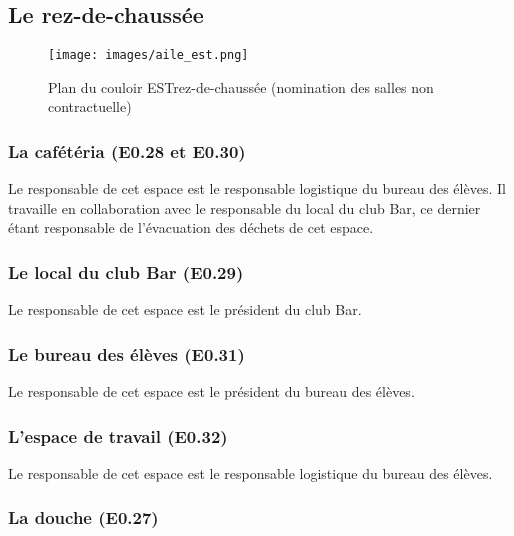 \documentclass{article} %
\begin{document}
		\subsection{Le rez-de-chaussée}
\label{sub:le_rez_de_chaussee}

		\begin{figure}[]
			\centering
			\texttt{[image: images/aile\_est.png]}
			\caption{Plan du couloir EST\@ rez-de-chaussée (nomination des salles
			non contractuelle)}
\label{fig:plan}
		\end{figure}

			\subsubsection{La cafétéria (E0.28 et E0.30)}
\label{ssub:la_cafeteria_e0_28_et_e0_30_}

				Le responsable de cet espace est le responsable logistique du
				bureau des élèves. Il travaille en collaboration avec le
				responsable du local du club Bar, ce dernier étant responsable
				de l’évacuation des déchets de cet espace.

			\subsubsection{Le local du club Bar (E0.29)}
\label{ssub:le_local_du_club_bar_e0_29_}

				Le responsable de cet espace est le président du club Bar.

			\subsubsection{Le bureau des élèves (E0.31)}
\label{ssub:le_bureau_des_eleves_e0_31_}

				Le responsable de cet espace est le président du bureau des
				élèves.

			\subsubsection{L'espace de travail (E0.32)}
\label{ssub:l_espace_de_travail_e0_32_}

			Le responsable de cet espace est le responsable logistique du
			bureau des élèves.

			\subsubsection{La douche (E0.27)}
\label{ssub:la_douche_e0_27_}
\end{document}
